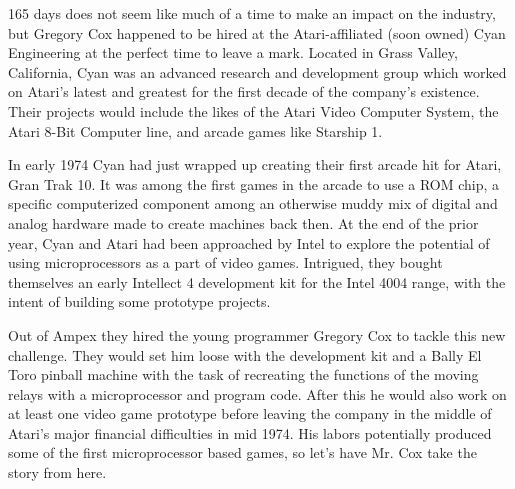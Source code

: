 165 days does not seem like much of a time to make an impact on the industry, but Gregory Cox happened to be hired at the Atari-affiliated (soon owned) Cyan Engineering at the perfect time to leave a mark. Located in Grass Valley, California, Cyan was an advanced research and development group which worked on Atari’s latest and greatest for the first decade of the company’s existence. Their projects would include the likes of the Atari Video Computer System, the Atari 8-Bit Computer line, and arcade games like Starship 1.

In early 1974 Cyan had just wrapped up creating their first arcade hit for Atari, Gran Trak 10. It was among the first games in the arcade to use a ROM chip, a specific computerized component among an otherwise muddy mix of digital and analog hardware made to create machines back then. At the end of the prior year, Cyan and Atari had been approached by Intel to explore the potential of using microprocessors as a part of video games. Intrigued, they bought themselves an early Intellect 4 development kit for the Intel 4004 range, with the intent of building some prototype projects.

Out of Ampex they hired the young programmer Gregory Cox to tackle this new challenge. They would set him loose with the development kit and a Bally El Toro pinball machine with the task of recreating the functions of the moving relays with a microprocessor and program code. After this he would also work on at least one video game prototype before leaving the company in the middle of Atari’s major financial difficulties in mid 1974. His labors potentially produced some of the first microprocessor based games, so let’s have Mr. Cox take the story from here.

\noindent\makebox[\linewidth]{\rule{\paperwidth}{0.4pt}}